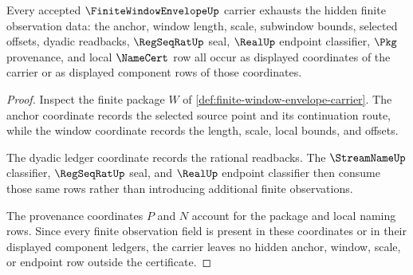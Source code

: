 \begin{theorem}
\label{thm:finite-window-envelope-ledger-exhaustion}
Every accepted $\FiniteWindowEnvelopeUp$ carrier exhausts the hidden finite observation data: the anchor, window length, scale, subwindow bounds, selected offsets, dyadic readbacks, $\RegSeqRatUp$ seal, $\RealUp$ endpoint classifier, $\Pkg$ provenance, and local $\NameCert$ row all occur as displayed coordinates of the carrier or as displayed component rows of those coordinates.
\end{theorem}
\begin{proof}
Inspect the finite package $W$ of \autoref{def:finite-window-envelope-carrier}. The anchor coordinate records the selected source point and its continuation route, while the window coordinate records the length, scale, local bounds, and offsets.

The dyadic ledger coordinate records the rational readbacks. The $\StreamNameUp$ classifier, $\RegSeqRatUp$ seal, and $\RealUp$ endpoint classifier then consume those same rows rather than introducing additional finite observations.

The provenance coordinates $P$ and $N$ account for the package and local naming rows. Since every finite observation field is present in these coordinates or in their displayed component ledgers, the carrier leaves no hidden anchor, window, scale, or endpoint row outside the certificate.
\end{proof}

